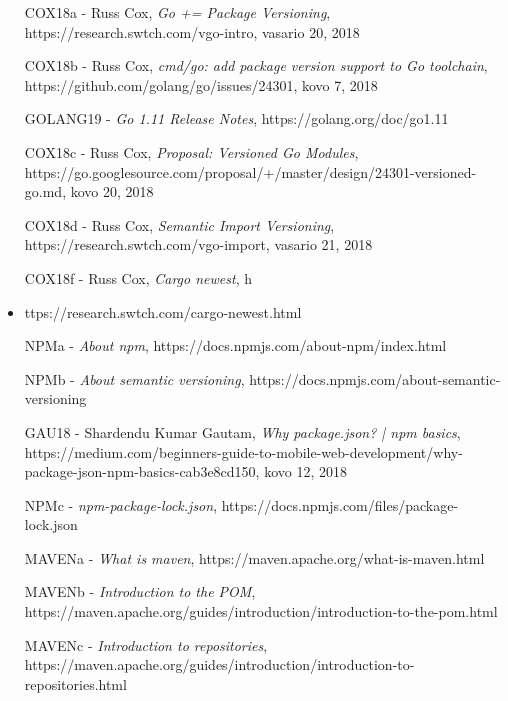 
\begin{itemize}
    \item [COX18a] - Russ Cox, \emph{Go += Package Versioning}, https://research.swtch.com/vgo-intro, vasario 20, 2018
    \item [COX18b] - Russ Cox, \emph{cmd/go: add package version support to Go toolchain}, https://github.com/golang/go/issues/24301, kovo 7, 2018
    \item [GOLANG19] - \emph{Go 1.11 Release Notes}, https://golang.org/doc/go1.11
    \item [COX18c] - Russ Cox, \emph{Proposal: Versioned Go Modules}, https://go.googlesource.com/proposal/+/master/design/24301-versioned-go.md, kovo 20, 2018
    \item [COX18d] - Russ Cox, \emph{Semantic Import Versioning}, https://research.swtch.com/vgo-import, vasario 21, 2018
    \item [COX18f] - Russ Cox, \emph{Cargo newest}, h
    \item ttps://research.swtch.com/cargo-newest.html
    \item[NPMa] - \emph{About npm}, https://docs.npmjs.com/about-npm/index.html
    \item[NPMb] - \emph{About semantic versioning}, https://docs.npmjs.com/about-semantic-versioning
    \item[GAU18] - Shardendu Kumar Gautam, \emph{Why package.json? | npm basics}, https://medium.com/beginners-guide-to-mobile-web-development/why-package-json-npm-basics-cab3e8cd150, kovo 12, 2018
    \item[NPMc] - \emph{npm-package-lock.json}, https://docs.npmjs.com/files/package-lock.json
    \item[MAVENa] - \emph{What is maven}, https://maven.apache.org/what-is-maven.html
    \item[MAVENb] - \emph{Introduction to the POM}, https://maven.apache.org/guides/introduction/introduction-to-the-pom.html
    \item[MAVENc] - \emph{Introduction to repositories}, https://maven.apache.org/guides/introduction/introduction-to-repositories.html

\end{itemize}
